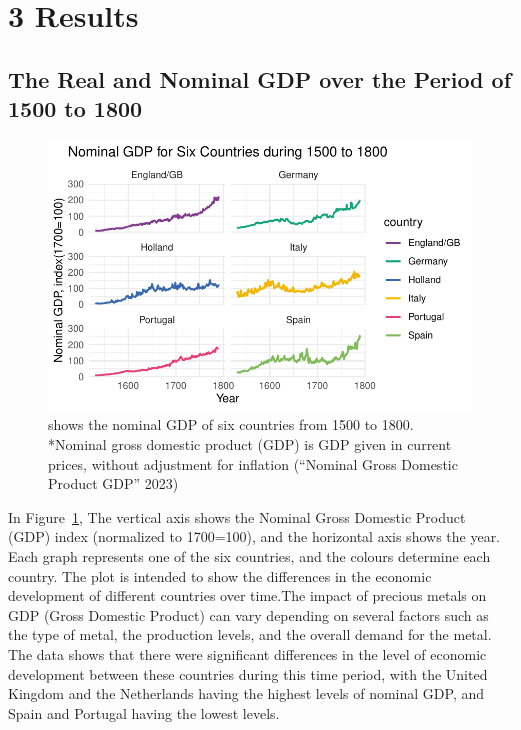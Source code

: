 \documentclass[
  letterpaper,
  DIV=11,
  numbers=noendperiod]{scrartcl}
\begin{document}
\newpage

\hypertarget{results}{%
\section{3 Results}\label{results}}

\hypertarget{the-real-and-nominal-gdp-over-the-period-of-1500-to-1800}{%
\subsection{The Real and Nominal GDP over the Period of 1500 to
1800}\label{the-real-and-nominal-gdp-over-the-period-of-1500-to-1800}}

\begin{figure}

{\centering \includegraphics{paper_files/figure-pdf/fig-nominalgdp-1.pdf}

}

\caption{\label{fig-nominalgdp}shows the nominal GDP of six countries
from 1500 to 1800. *Nominal gross domestic product (GDP) is GDP given in
current prices, without adjustment for inflation ({``Nominal {Gross}
{Domestic} {Product} {GDP}''} 2023)}

\end{figure}

In Figure~\ref{fig-nominalgdp}, The vertical axis shows the Nominal
Gross Domestic Product (GDP) index (normalized to 1700=100), and the
horizontal axis shows the year. Each graph represents one of the six
countries, and the colours determine each country. The plot is intended
to show the differences in the economic development of different
countries over time.The impact of precious metals on GDP (Gross Domestic
Product) can vary depending on several factors such as the type of
metal, the production levels, and the overall demand for the metal. The
data shows that there were significant differences in the level of
economic development between these countries during this time period,
with the United Kingdom and the Netherlands having the highest levels of
nominal GDP, and Spain and Portugal having the lowest levels. \newpage
\end{document}
